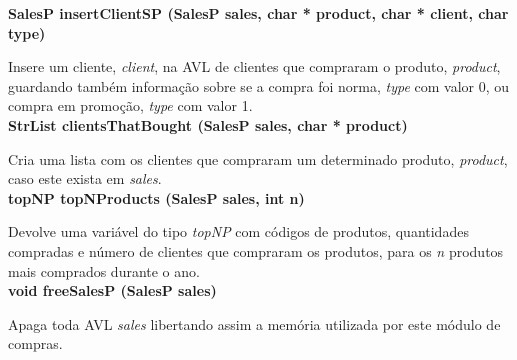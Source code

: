 \documentclass[12pt] {article}
\begin{document}
\noindent \textbf {SalesP insertClientSP (SalesP sales, char * product, char * client, char type)}
\par Insere um cliente, \emph{client}, na AVL de clientes que compraram o produto, \emph{product}, guardando 
também informação sobre se a compra foi norma, \emph{type} com valor 0, ou compra em promoção, 
\emph{type} com valor 1.\\

\noindent \textbf {StrList clientsThatBought (SalesP sales, char * product)}
\par Cria uma lista com os clientes que compraram um determinado produto, \emph{product}, caso este exista em
 \emph{sales}.\\
 
\noindent \textbf {topNP topNProducts (SalesP sales, int n)}
\par Devolve uma variável do tipo \emph{topNP} com códigos de produtos, quantidades compradas e número de 
clientes que compraram os produtos, para os \emph{n} produtos mais comprados durante o ano.\\

\noindent \textbf {void freeSalesP (SalesP sales)}
\par Apaga toda AVL \emph{sales} libertando assim a memória utilizada por este módulo de compras.\\
\end{document}
